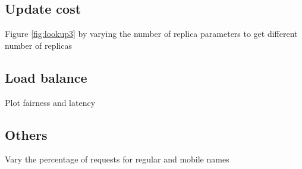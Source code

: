 \subsection{Update cost}

Figure \ref{fig:lookup3} by varying the number of replica parameters to get different number of replicas


\subsection{Load balance}

Plot fairness and latency

\subsection{Others}

Vary the percentage of requests for regular and mobile names




